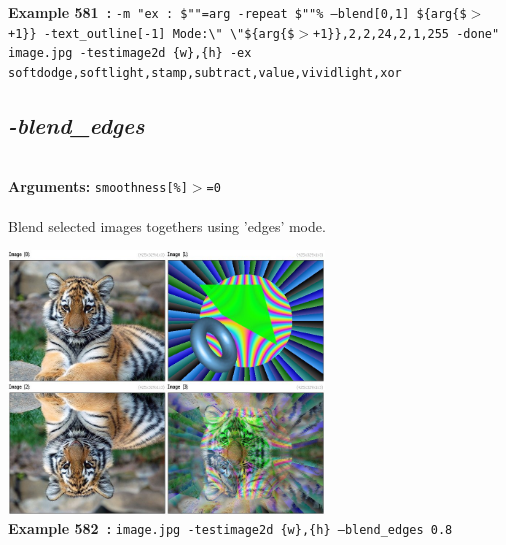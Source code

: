 \documentclass[a4paper,11pt,twoside]{book}
\begin{document}
\begin{center}
{\footnotesize \textbf{Example 581~:} \texttt{-m "ex : \$""=arg -repeat \$""\% --blend[0,1] \$\{arg\{\$$>$+1\}\} -text\_outline[-1] Mode:\textbackslash " \textbackslash "\$\{arg\{\$$>$+1\}\},2,2,24,2,1,255 -done" image.jpg -testimage2d \{w\},\{h\} -ex softdodge,softlight,stamp,subtract,value,vividlight,xor}}
\end{center}

\subsection{\emph{-blend\_edges} }\vspace*{-0.5em}
~\\\textbf{Arguments: } 
{\small \texttt{smoothness[\%]$>$=0}}\\~\\
Blend selected images togethers using 'edges' mode.
\begin{center}\includegraphics[keepaspectratio=true,height=7cm,width=\textwidth]{img/gmic_def582.jpg}\\
{\footnotesize \textbf{Example 582~:} \texttt{image.jpg -testimage2d \{w\},\{h\} --blend\_edges 0.8}}
\end{center}
\end{document}
